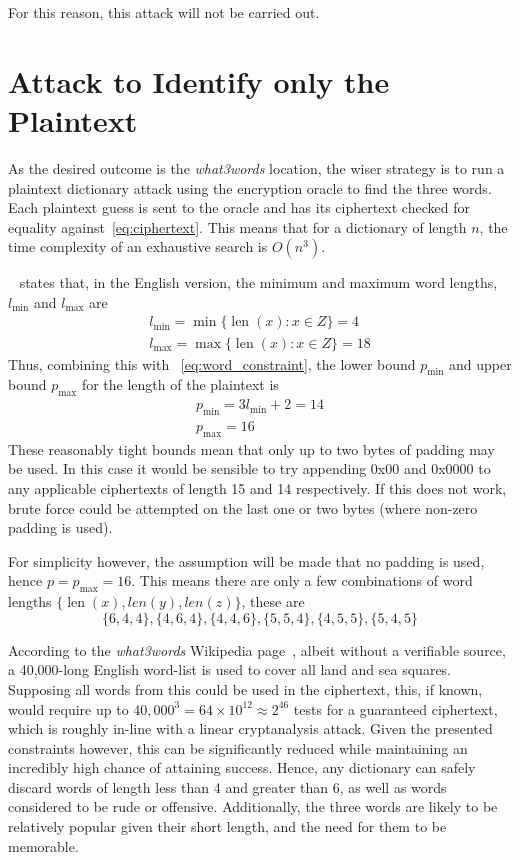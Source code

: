 \documentclass[11pt]{article}
\DeclareMathOperator{\len}{len}
\begin{document}
    For this reason, this attack will not be carried out.


    \section{Attack to Identify only the Plaintext}\label{sec:plaintext-identification-attack}
    As the desired outcome is the \textit{what3words} location, the wiser strategy is to run a plaintext dictionary attack using the encryption oracle to find the three words.
    Each plaintext guess is sent to the oracle and has its ciphertext checked for equality against~\eqref{eq:ciphertext}.
    This means that for a dictionary of length $n$, the time complexity of an exhaustive search is $O(n^3)$.

    ~\cite{what3words_support} states that, in the English version, the minimum and maximum word lengths, $l_{\min}$ and $l_{\max}$ are
    \begin{gather*}
        l_{\min} = \min\{ \len(x) : x \in Z \} = 4\\
        l_{\max} = \max\{ \len(x) : x \in Z \} = 18
    \end{gather*}
    Thus, combining this with ~\eqref{eq:word_constraint}, the lower bound $p_{\min}$ and upper bound $p_{\max}$ for the length of the plaintext is
    \begin{gather*}
        p_{\min} = 3l_{\min} + 2 = 14\\
        p_{\max} = 16
    \end{gather*}
    These reasonably tight bounds mean that only up to two bytes of padding may be used.
    In this case it would be sensible to try appending 0x00 and 0x0000 to any applicable ciphertexts of length 15 and 14 respectively.
    If this does not work, brute force could be attempted on the last one or two bytes (where non-zero padding is used).

    For simplicity however, the assumption will be made that no padding is used, hence $p = p_{\max} = 16$.
    This means there are only a few combinations of word lengths $\{\len(x), len(y), len(z)\}$, these are
    \[\{6, 4, 4\}, \{4, 6, 4\}, \{4, 4, 6\}, \{5, 5, 4\}, \{4, 5, 5\}, \{5, 4, 5\}\]

    According to the \textit{what3words} Wikipedia page~\cite{what3words_wikipedia}, albeit without a verifiable source, a 40,000-long English word-list is used to cover all land and sea squares.
    Supposing all words from this could be used in the ciphertext, this, if known, would require up to $40,000^3 = 64\times10^{12} \approx 2^{46}$ tests for a guaranteed ciphertext, which is roughly in-line with a linear cryptanalysis attack.
    Given the presented constraints however, this can be significantly reduced while maintaining an incredibly high chance of attaining success.
    Hence, any dictionary can safely discard words of length less than 4 and greater than 6, as well as words considered to be rude or offensive.
    Additionally, the three words are likely to be relatively popular given their short length, and the need for them to be memorable.
\end{document}
